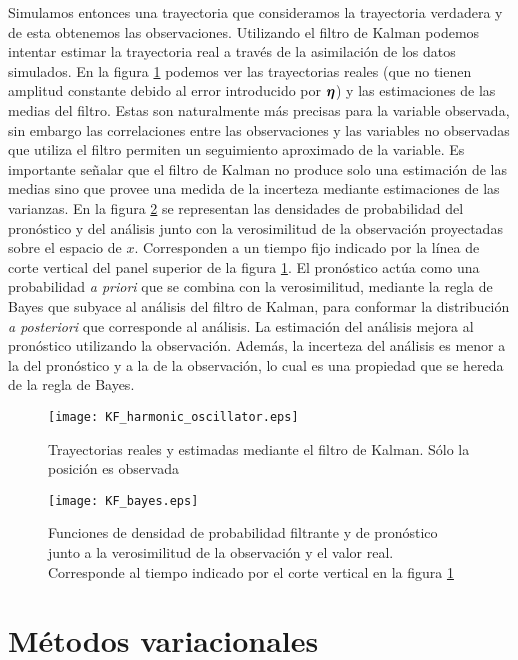 Simulamos entonces una trayectoria que consideramos la trayectoria verdadera y de esta obtenemos las observaciones. Utilizando el filtro de Kalman podemos intentar estimar la trayectoria real a través de la asimilación de los datos simulados. En la figura \ref{fig:KF_harmonic_oscillator} podemos ver las trayectorias reales (que no tienen amplitud constante debido al error introducido por $\mbox{\boldmath$ \eta $}$) y las estimaciones de las medias del filtro. Estas son naturalmente más precisas para la variable observada, sin embargo las correlaciones entre las observaciones y las variables no observadas que utiliza el filtro permiten un seguimiento aproximado de la variable. Es importante señalar que el filtro de Kalman no produce solo una estimación de las medias sino que provee una medida de la incerteza mediante estimaciones de las varianzas. En la figura \ref{fig:KF_bayes} se representan las densidades de probabilidad del pronóstico y del análisis junto con la verosimilitud de la observación proyectadas sobre el espacio de $x$. Corresponden a un tiempo fijo indicado por la línea de corte vertical del panel superior de la figura \ref{fig:KF_harmonic_oscillator}. El pronóstico actúa como una probabilidad \textit{a priori} que se combina con la verosimilitud, mediante la regla de Bayes que subyace al análisis del filtro de Kalman, para conformar la distribución \textit{a posteriori} que corresponde al análisis. La estimación del análisis mejora al pronóstico utilizando la observación. Además, la incerteza del análisis es menor a la del pronóstico y a la de la observación, lo cual es una propiedad que se hereda de la regla de Bayes.

\begin{figure}[h!]
    \centering
    \texttt{[image: KF\_harmonic\_oscillator.eps]}
    \caption{Trayectorias reales y estimadas mediante el filtro de Kalman. Sólo la posición es observada}
    \label{fig:KF_harmonic_oscillator}
\end{figure}

\begin{figure}[h!]
    \centering
    \texttt{[image: KF\_bayes.eps]}
    \caption{Funciones de densidad de probabilidad filtrante y de pronóstico junto a la verosimilitud de la observación y el valor real. Corresponde al tiempo indicado por el corte vertical en la figura \ref{fig:KF_harmonic_oscillator}}
    \label{fig:KF_bayes}
\end{figure}

\section{Métodos variacionales}


